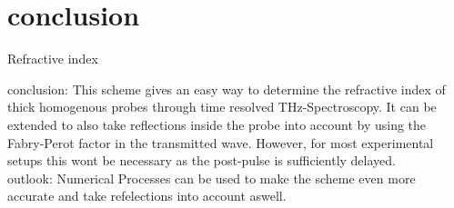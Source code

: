 \documentclass[aspectratio=1610, 9pt]{beamer}
\begin{document}
%
%
\section{conclusion}
\begin{frame}{Refractive index}
  \begin{center}
  \textcolor{tugreen}{conclusion:}
  This scheme gives an easy way to determine the refractive index of thick homogenous probes through time resolved THz-Spectroscopy.
  It can be extended to also take reflections inside the probe into account by using the Fabry-Perot factor in the transmitted wave.
  However, for most experimental setups this wont be necessary as the post-pulse is sufficiently delayed.\\
  \textcolor{tugreen}{outlook:}
  Numerical Processes can be used to make the scheme even more accurate and take refelections into account aswell.
\end{center}
\end{frame}
\end{document}
